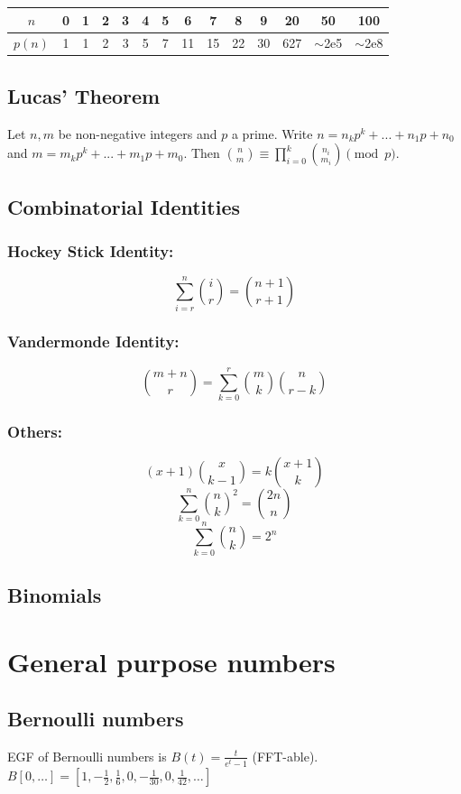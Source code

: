 		\begin{center}
		\begin{tabular}{c|c@{\ }c@{\ }c@{\ }c@{\ }c@{\ }c@{\ }c@{\ }c@{\ }c@{\ }c@{\ }c@{\ }c@{\ }c}
			$n$    & 0 & 1 & 2 & 3 & 4 & 5 & 6  & 7  & 8  & 9  & 20  & 50  & 100 \\ \hline
			$p(n)$ & 1 & 1 & 2 & 3 & 5 & 7 & 11 & 15 & 22 & 30 & 627 & $\mathtt{\sim}$2e5 & $\mathtt{\sim}$2e8 \\
		\end{tabular}
		\end{center}

	\subsection{Lucas' Theorem}
		Let $n,m$ be non-negative integers and $p$ a prime. Write $n=n_kp^k+...+n_1p+n_0$ and $m=m_kp^k+...+m_1p+m_0$. Then $\binom{n}{m} \equiv \prod_{i=0}^k\binom{n_i}{m_i} \pmod{p}$.

	\subsection{Combinatorial Identities}
		\subsubsection{Hockey Stick Identity:}
		\[ \sum_{i=r}^{n} \binom{i}{r} = \binom{n+1}{r+1} \]
		\subsubsection{Vandermonde Identity:}
		\[ \binom{m+n}{r} = \sum_{k=0}^{r} \binom{m}{k}\binom{n}{r-k} \]
		\subsubsection{Others:}
		\[ (x+1) \binom{x}{k-1} = k \binom{x+1}{k} \]
		\[ \sum_{k=0}^{n} \binom{n}{k}^2 = \binom{2n}{n} \]
		\[ \sum_{k=0}^{n} \binom{n}{k} = 2^n \]

	\subsection{Binomials}

\section{General purpose numbers}
	\subsection{Bernoulli numbers}
		EGF of Bernoulli numbers is $B(t)=\frac{t}{e^t-1}$ (FFT-able).
		$B[0,\ldots] = [1, -\frac{1}{2}, \frac{1}{6}, 0, -\frac{1}{30}, 0, \frac{1}{42}, \ldots]$

